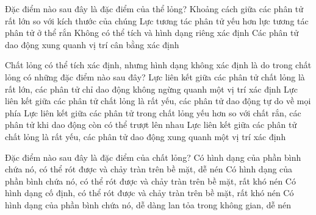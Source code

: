 \begin{ex}
	Đặc điểm nào sau đây là đặc điểm của thể lỏng?	
	\choice
	{Khoảng cách giữa các phân tử rất lớn so với kích thước của chúng}
	{\True Lực tương tác phân tử yếu hơn lực tương tác phân tử ở thể rắn}
	{Không có thể tích và hình dạng riêng xác định}
	{Các phân tử dao động xung quanh vị trí cân bằng xác định}
\end{ex}

\begin{ex}
	Chất lỏng có thể tích xác định, nhưng hình dạng không xác định là do trong chất lỏng có những đặc điểm nào sau đây?
	\choice
	{Lực liên kết giữa các phân tử chất lỏng là rất lớn, các phân tử chỉ dao động không ngừng quanh một vị trí xác định}
	{Lực liên kết giữa các phân tử chất lỏng là rất yếu, các phân tử dao động tự do về mọi phía}
	{\True Lực liên kết giữa các phân tử trong chất lỏng yếu hơn so với chất rắn, các phân tử khi dao động còn có thể trượt lên nhau}
	{Lực liên kết giữa các phân tử chất lỏng là rất yếu, các phân tử dao động xung quanh một vị trí xác định}
\end{ex}















\begin{ex}
	Đặc điểm nào sau đây là đặc điểm của chất lỏng?
	\choice
	{Có hình dạng của phần bình chứa nó, có thể rót được và chảy tràn trên bề mặt, dễ nén}
	{\True Có hình dạng của phần bình chứa nó, có thể rót được và chảy tràn trên bề mặt, rất khó nén}
	{Có hình dạng cố định, có thể rót được và chảy tràn trên bề mặt, rất khó nén}
	{Có hình dạng của phần bình chứa nó, dễ dàng lan tỏa trong không gian, dễ nén}
\end{ex}


